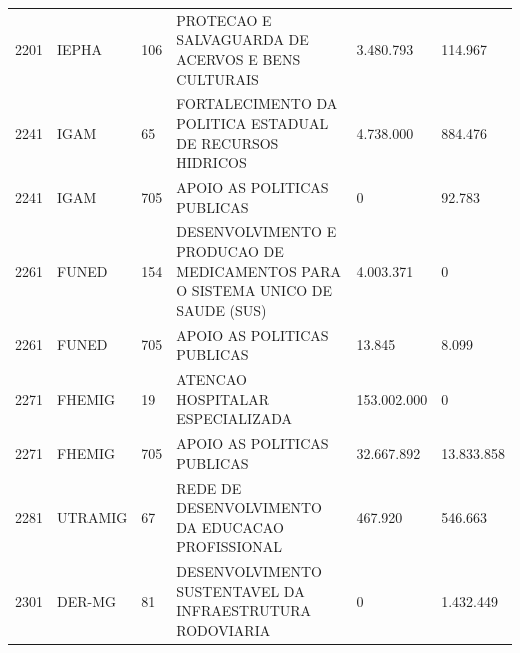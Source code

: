 \documentclass{article}
\begin{document}
\begin{longtable}[c]{m{1cm}|m{1.5cm}|m{1cm}m{8cm}|m{2cm}m{2cm}}
\multicolumn{1}{C{1cm}|}{2201} & \multicolumn{1}{L{1.5cm}|}{IEPHA} & \multicolumn{1}{C{1cm}|}{106} & \multicolumn{1}{L{8cm}|}{PROTECAO E SALVAGUARDA DE ACERVOS E BENS CULTURAIS} & \multicolumn{1}{R{2cm}|}{3.480.793} & \multicolumn{1}{R{2cm}}{114.967} \\
\multicolumn{1}{C{1cm}|}{2241} & \multicolumn{1}{L{1.5cm}|}{IGAM} & \multicolumn{1}{C{1cm}|}{65} & \multicolumn{1}{L{8cm}|}{FORTALECIMENTO DA POLITICA ESTADUAL DE RECURSOS HIDRICOS} & \multicolumn{1}{R{2cm}|}{4.738.000} & \multicolumn{1}{R{2cm}}{884.476} \\
\multicolumn{1}{C{1cm}|}{2241} & \multicolumn{1}{L{1.5cm}|}{IGAM} & \multicolumn{1}{C{1cm}|}{705} & \multicolumn{1}{L{8cm}|}{APOIO AS POLITICAS PUBLICAS} & \multicolumn{1}{R{2cm}|}{            0} & \multicolumn{1}{R{2cm}}{92.783} \\
\multicolumn{1}{C{1cm}|}{2261} & \multicolumn{1}{L{1.5cm}|}{FUNED} & \multicolumn{1}{C{1cm}|}{154} & \multicolumn{1}{L{8cm}|}{DESENVOLVIMENTO E PRODUCAO DE MEDICAMENTOS PARA O SISTEMA UNICO DE SAUDE (SUS)} & \multicolumn{1}{R{2cm}|}{4.003.371} & \multicolumn{1}{R{2cm}}{            0} \\
\multicolumn{1}{C{1cm}|}{2261} & \multicolumn{1}{L{1.5cm}|}{FUNED} & \multicolumn{1}{C{1cm}|}{705} & \multicolumn{1}{L{8cm}|}{APOIO AS POLITICAS PUBLICAS} & \multicolumn{1}{R{2cm}|}{13.845} & \multicolumn{1}{R{2cm}}{8.099} \\
\multicolumn{1}{C{1cm}|}{2271} & \multicolumn{1}{L{1.5cm}|}{FHEMIG} & \multicolumn{1}{C{1cm}|}{19} & \multicolumn{1}{L{8cm}|}{ATENCAO HOSPITALAR ESPECIALIZADA} & \multicolumn{1}{R{2cm}|}{153.002.000} & \multicolumn{1}{R{2cm}}{            0} \\
\multicolumn{1}{C{1cm}|}{2271} & \multicolumn{1}{L{1.5cm}|}{FHEMIG} & \multicolumn{1}{C{1cm}|}{705} & \multicolumn{1}{L{8cm}|}{APOIO AS POLITICAS PUBLICAS} & \multicolumn{1}{R{2cm}|}{32.667.892} & \multicolumn{1}{R{2cm}}{13.833.858} \\
\multicolumn{1}{C{1cm}|}{2281} & \multicolumn{1}{L{1.5cm}|}{UTRAMIG} & \multicolumn{1}{C{1cm}|}{67} & \multicolumn{1}{L{8cm}|}{REDE DE DESENVOLVIMENTO DA EDUCACAO PROFISSIONAL} & \multicolumn{1}{R{2cm}|}{467.920} & \multicolumn{1}{R{2cm}}{546.663} \\
\multicolumn{1}{C{1cm}|}{2301} & \multicolumn{1}{L{1.5cm}|}{DER-MG} & \multicolumn{1}{C{1cm}|}{81} & \multicolumn{1}{L{8cm}|}{DESENVOLVIMENTO SUSTENTAVEL DA INFRAESTRUTURA RODOVIARIA} & \multicolumn{1}{R{2cm}|}{            0} & \multicolumn{1}{R{2cm}}{1.432.449} \\

\end{longtable}
\end{document}
